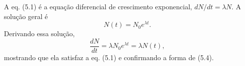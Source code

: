 A eq. (5.1) é a equação diferencial de crescimento exponencial, $dN/dt=\lambda N$. A solução geral é
\[
N(t)=N_{0}e^{\lambda t}.
\]
Derivando essa solução,
\[
\frac{dN}{dt}=\lambda N_{0}e^{\lambda t}=\lambda N(t),
\]
mostrando que ela satisfaz a eq. (5.1) e confirmando a forma de (5.4).